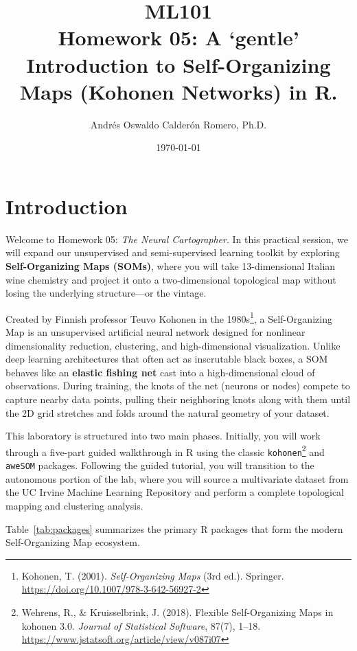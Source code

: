 \documentclass[11pt]{article}
\title{ML101 \\ Homework 05: A `gentle' Introduction to Self-Organizing Maps (Kohonen Networks) in R.}
\author{Andr\'es Oswaldo Calder\'on Romero, Ph.D.}
\date{\today}
\begin{document}
\maketitle

\section{Introduction}
\label{sec:intro}

Welcome to Homework 05: \textit{The Neural Cartographer}. In this practical session, we will expand our unsupervised and semi-supervised learning toolkit by exploring \textbf{Self-Organizing Maps (SOMs)}, where you will take 13-dimensional Italian wine chemistry and project it onto a two-dimensional topological map without losing the underlying structure---or the vintage.

Created by Finnish professor Teuvo Kohonen in the 1980s\footnote{Kohonen, T. (2001). \textit{Self-Organizing Maps} (3rd ed.). Springer. \url{https://doi.org/10.1007/978-3-642-56927-2}}, a Self-Organizing Map is an unsupervised artificial neural network designed for nonlinear dimensionality reduction, clustering, and high-dimensional visualization. Unlike deep learning architectures that often act as inscrutable black boxes, a SOM behaves like an \textbf{elastic fishing net} cast into a high-dimensional cloud of observations. During training, the knots of the net (neurons or nodes) compete to capture nearby data points, pulling their neighboring knots along with them until the 2D grid stretches and folds around the natural geometry of your dataset.

This laboratory is structured into two main phases. Initially, you will work through a five-part guided walkthrough in R using the classic \texttt{kohonen}\footnote{Wehrens, R., \& Kruisselbrink, J. (2018). Flexible Self-Organizing Maps in kohonen 3.0. \textit{Journal of Statistical Software}, 87(7), 1--18. \url{https://www.jstatsoft.org/article/view/v087i07}} and \texttt{aweSOM} packages. Following the guided tutorial, you will transition to the autonomous portion of the lab, where you will source a multivariate dataset from the UC Irvine Machine Learning Repository and perform a complete topological mapping and clustering analysis.

Table~\ref{tab:packages} summarizes the primary R packages that form the modern Self-Organizing Map ecosystem.
\end{document}
